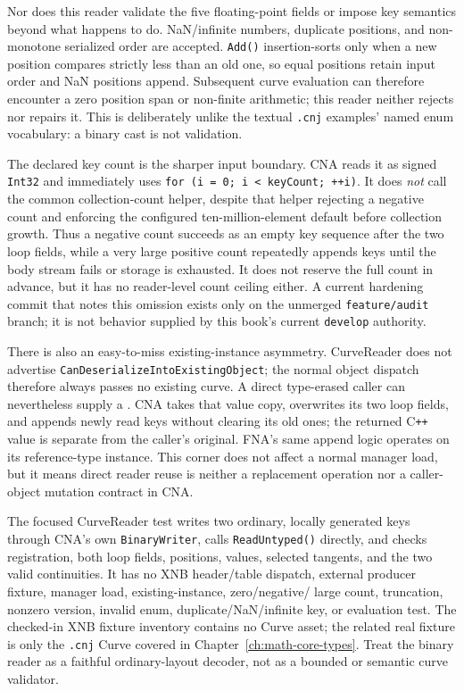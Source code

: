 Nor does this reader validate the five floating-point fields or impose key semantics beyond what
 happens to do. NaN/infinite numbers, duplicate positions, and
non-monotone serialized order are accepted. \texttt{Add()} insertion-sorts only when a new
position compares strictly less than an old one, so equal positions retain input order and NaN
positions append. Subsequent curve evaluation can therefore encounter a zero position span or
non-finite arithmetic; this reader neither rejects nor repairs it. This is deliberately unlike
the textual \texttt{.cnj} examples' named enum vocabulary: a binary cast is not validation.

The declared key count is the sharper input boundary. CNA reads it as signed \texttt{Int32} and
immediately uses \texttt{for (i = 0; i < keyCount; ++i)}. It does \emph{not} call
the common collection-count helper, despite that helper rejecting a
negative count and enforcing the configured ten-million-element default before collection
growth. Thus a negative count succeeds as an empty key sequence after the two loop fields, while
a very large positive count repeatedly appends keys until the body stream fails or storage is
exhausted. It does not reserve the full count in advance, but it has no reader-level count ceiling
either. A current hardening commit that notes this omission exists only on the unmerged
\texttt{feature/audit} branch; it is not behavior supplied by this book's current
\texttt{develop} authority.

There is also an easy-to-miss existing-instance asymmetry. CurveReader does not advertise
\texttt{CanDeserializeIntoExistingObject}; the normal  object dispatch
therefore always passes no existing curve. A direct type-erased caller can nevertheless supply a
. CNA takes that value copy, overwrites its two loop fields, and appends newly
read keys without clearing its old ones; the returned C\texttt{++} value is separate from the
caller's original. FNA's same append logic operates on its reference-type instance. This corner
does not affect a normal manager load, but it means direct reader reuse is neither a replacement
operation nor a caller-object mutation contract in CNA.

The focused CurveReader test writes two ordinary, locally generated keys through CNA's own
\texttt{BinaryWriter}, calls \texttt{ReadUntyped()} directly, and checks registration, both loop
fields, positions, values, selected tangents, and the two valid continuities. It has no XNB
header/table dispatch, external producer fixture, manager load, existing-instance, zero/negative/
large count, truncation, nonzero version, invalid enum, duplicate/NaN/infinite key, or evaluation
test. The checked-in XNB fixture inventory contains no Curve asset; the related real fixture is
only the \texttt{.cnj} Curve covered in Chapter~\ref{ch:math-core-types}. Treat the binary
reader as a faithful ordinary-layout decoder, not as a bounded or semantic curve validator.

